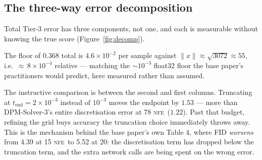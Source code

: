 \documentclass[11pt,a4paper]{article}
\newcommand{\NFE}{\textsc{nfe}}
\begin{document}
\subsection{The three-way error decomposition}

Total Tier-3 error has three components, not one, and each is measurable without
knowing the true score (Figure~\ref{fig:decomp}).

\begin{center}
\end{center}

The floor of $0.368$ total is $4.6\times10^{-2}$ per sample against
$\lVert x\rVert \approx \sqrt{3072} \approx 55$, i.e.\ ${\approx}\,8\times10^{-4}$
relative --- matching the ${\sim}10^{-3}$ float32 floor the base paper's
practitioners would predict, here measured rather than assumed.

The instructive comparison is between the second and first columns. Truncating at
$t_{\text{end}} = 2\times10^{-3}$ instead of $10^{-3}$ moves the endpoint by
$1.53$ --- more than DPM-Solver-3's entire discretisation error at 78 \NFE\
($1.22$). Past that budget, refining the grid buys accuracy the truncation
choice immediately throws away. This is the mechanism behind the base paper's own
Table 4, where FID \emph{worsens} from 4.39 at 15 \NFE\ to 5.52 at 20: the
discretisation term has dropped below the truncation term, and the extra network
calls are being spent on the wrong error.
\end{document}
